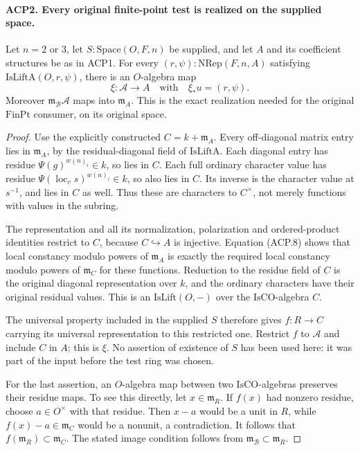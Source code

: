 \documentclass[11pt,a4paper]{article}
\numberwithin{equation}{section}
\theoremstyle{remark}\newtheorem{remark}[theorem]{Remark}
\begin{document}
\paragraph{ACP2. Every original finite-point test is realized on the supplied space.}
\label{claim:ACP2}
Let \(n=2\) or \(3\), let \(S:\mathrm{Space}(O,F,n)\) be
supplied, and let \(A\) and its coefficient structures be as in
ACP1.  For every \((r,\psi):\mathrm{NRep}(F,n,A)\) satisfying
\(\mathrm{IsLiftA}(O,r,\psi)\), there is an \(O\)-algebra map
\[
 \xi:\mathcal A\longrightarrow A
 \quad\text{with}\quad \xi_*u=(r,\psi).
                                                        \tag{ACP.10}
\]
Moreover \(\mathfrak m_{\mathcal B}\mathcal A\) maps into
\(\mathfrak m_A\).  This is the exact realization needed for
the original \(\mathrm{FinPt}\) consumer, on its original space.

\begin{proof}
Use the explicitly constructed \(C=k+\mathfrak m_A\).
Every off-diagonal matrix entry lies in \(\mathfrak m_A\),
by the residual-diagonal field of \(\mathrm{IsLiftA}\).
Each diagonal entry has residue
\(\Psi(g)^{w(n)_i}\in k\), so lies in \(C\).
Each full ordinary character value has residue
\(\Psi(\operatorname{loc}_v s)^{w(n)_i}\in k\), so also lies
in \(C\).  Its inverse is the character value at \(s^{-1}\),
and lies in \(C\) as well.  Thus these are characters to
\(C^\times\), not merely functions with values in the subring.

The representation and all its normalization, polarization and
ordered-product identities restrict to \(C\), because
\(C\hookrightarrow A\) is injective.  Equation (ACP.8) shows
that local constancy modulo powers of \(\mathfrak m_A\)
is exactly the required local constancy modulo powers of
\(\mathfrak m_C\) for these functions.  Reduction to the
residue field of \(C\) is the original diagonal representation
over \(k\), and the ordinary characters have their original
residual values.  This is an \(\mathrm{IsLift}(O,-)\) over
the \(\mathrm{IsCO}\)-algebra \(C\).

The universal property included in the supplied \(S\) therefore
gives \(f:R\to C\) carrying its universal representation to
this restricted one.  Restrict \(f\) to \(\mathcal A\) and
include \(C\) in \(A\); this is \(\xi\).
No assertion of existence of \(S\) has been used here: it was
part of the input before the test ring was chosen.

For the last assertion, an \(O\)-algebra map between two
\(\mathrm{IsCO}\)-algebras preserves their residue maps.
To see this directly, let \(x\in\mathfrak m_R\).  If \(f(x)\)
had nonzero residue, choose \(a\in O^\times\) with that residue.
Then \(x-a\) would be a unit in \(R\), while
\(f(x)-a\in\mathfrak m_C\) would be a nonunit, a contradiction.
It follows that \(f(\mathfrak m_R)\subset\mathfrak m_C\).
The stated image condition follows from
\(\mathfrak m_{\mathcal B}\subset\mathfrak m_R\).
\end{proof}
\end{document}
